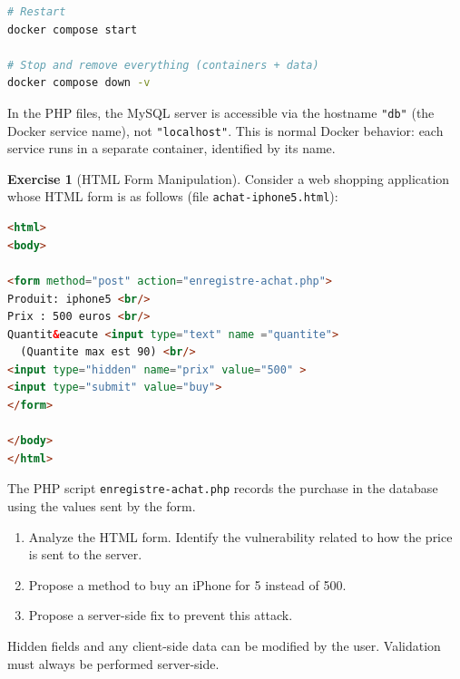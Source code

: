 \documentclass[a4paper,11pt]{article}
\theoremstyle{plain}
\theoremstyle{definition}
\newtheorem{exercice}{Exercise}
\begin{document}
\begin{tcolorbox}[colback=gray!5!white, colframe=gray!60!black, title={Setup with Docker}]
\begin{lstlisting}[language=bash,numbers=none]
# Restart
docker compose start

# Stop and remove everything (containers + data)
docker compose down -v
\end{lstlisting}

\medskip
\begin{attention}
In the PHP files, the MySQL server is accessible via the hostname \texttt{"db"} (the Docker service name), not \texttt{"localhost"}. This is normal Docker behavior: each service runs in a separate container, identified by its name.
\end{attention}

\end{tcolorbox}

\bigskip



\begin{exercice}[HTML Form Manipulation]

Consider a web shopping application whose HTML form is as follows (file \texttt{achat-iphone5.html}):

\begin{lstlisting}[language=HTML]
<html>
<body>

<form method="post" action="enregistre-achat.php">
Produit: iphone5 <br/>
Prix : 500 euros <br/>
Quantit&eacute <input type="text" name ="quantite">
  (Quantite max est 90) <br/>
<input type="hidden" name="prix" value="500" >
<input type="submit" value="buy">
</form>

</body>
</html>
\end{lstlisting}

The PHP script \texttt{enregistre-achat.php} records the purchase in the database using the values sent by the form.

\begin{enumerate}
    \item Analyze the HTML form. Identify the vulnerability related to how the price is sent to the server.
    \item Propose a method to buy an iPhone for \texteuro{}5 instead of \texteuro{}500.
    \item Propose a server-side fix to prevent this attack.
\end{enumerate}

\begin{pointcle}
Hidden fields and any client-side data can be modified by the user. Validation must always be performed server-side.
\end{pointcle}

\end{exercice}
\end{document}
